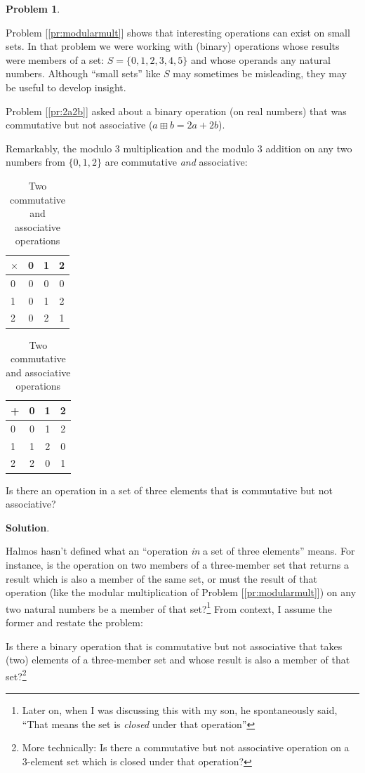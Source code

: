 \documentclass[english,notitlepage,smartquotes]{hgbreport}
\theoremstyle{definition}
\theoremstyle{definition}
\newtheorem{problem}{Problem}
\theoremstyle{remark}
\theoremstyle{definition}
\theoremstyle{plain}
\theoremstyle{definition}
\begin{document}
\begin{problem}
\label{pr:smallsets}
\end{problem}
Problem [\ref{pr:modularmult}] shows that interesting operations can exist on small sets. In that problem we were working with (binary) operations whose results were members of a set: $S=\{0,1,2,3,4,5\}$ and whose operands any natural numbers. Although ``small sets'' like $S$ may sometimes be misleading, they may be useful to develop insight.

Problem [\ref{pr:2a2b}] asked about a binary operation (on real numbers) that was commutative but not associative ($a\boxplus b=2a+2b$).

Remarkably, the modulo 3 multiplication and the modulo 3 addition on any two numbers from $\{0,1,2\}$ are commutative \textit{and} associative:

\begin{table}[h!]
\centering
\begin{tabular}{l|ccc}
$\times$&0&1&2\\
\hline
0&0&0&0\\
1&0&1&2\\
2&0&2&1\\
\end{tabular}
\quad\quad\quad
\begin{tabular}{l|ccc}
+&0&1&2\\
\hline
0&0&1&2\\
1&1&2&0\\
2&2&0&1\\
\end{tabular}
\caption{Two commutative and associative operations}
\label{tab:twoops}
\end{table}

Is there an operation in a set of three elements that is commutative but not associative?

\textbf{Solution}.

Halmos hasn't defined what an ``operation \textit{in} a set of three elements'' means. For instance, is the operation on two members of a three-member set that returns a result which is also a member of the same set, or must the result of that operation (like the modular multiplication of Problem [\ref{pr:modularmult}]) on any two natural numbers be a member of that set?\footnote{Later on, when I was discussing this with my son, he spontaneously said, ``That means the set is \emph{closed} under that operation''} From context, I assume the former and restate the problem:

Is there a binary operation that is commutative but not associative that takes (two) elements of a three-member set and whose result is also a member of that set?\footnote{More technically: Is there a commutative but not associative operation on a 3-element set which is closed under that operation?}
\end{document}
